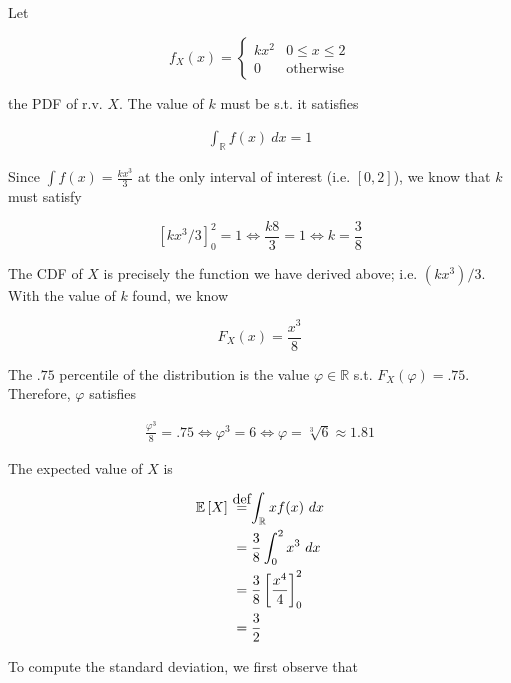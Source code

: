 \documentclass[a4paper, 12pt]{article}
\newcommand\myeq{\stackrel{\mathclap{\normalfont\mbox{def}}}{=}}
\begin{document}
\pagebreak 

Let 

\begin{equation*}
    f_X(x) = \begin{cases}
        kx^2 & 0 \leq x \leq 2 \\ 
        0 & \text{otherwise}
    \end{cases}
\end{equation*}

the PDF of r.v. $X$. The value of $k$ must be s.t. it satisfies 

\begin{align*}
    \int_{\mathbb{R}} f(x) ~ dx = 1
\end{align*}

Since $\int f(x) = \frac{kx^3}{3}$ at the only interval of interest (i.e. $[0, 2]$), we know that $k$
must satisfy 

\begin{equation*}
    \left[ kx^3 / 3 \right]_{0}^{2} = 1 \iff \frac{k8}{3} = 1 \iff k = \frac{3}{8}
\end{equation*}

The CDF of $X$ is precisely the function we have derived above; i.e. $(kx^3) / 3$. With the value 
of $k$ found, we know 

\begin{equation*}
    F_X(x) = \frac{ x^3 }{8}
\end{equation*}

The $.75$ percentile of the distribution is the value $\varphi \in \mathbb{R}$ s.t. 
$F_X(\varphi) = .75$. Therefore, $\varphi$ satisfies

\begin{align*}
    \frac{\varphi^3}{8} = .75 \iff \varphi^3 = 6 \iff \varphi = \sqrt[3]{6} \approx 1.81
\end{align*}


The expected value of $X$ is 

\begin{align*}
    \mathbb{E}\left[ X \right] ~&\myeq \int_{\mathbb{R}} x f(x) ~ dx \\ 
                                &= \frac{3}{8}\int_0^2  x^3 ~ dx \\ 
                                &=\frac{3}{8} \left[ \frac{x^4}{4} \right]_0^2  \\ 
                                &=\frac{3}{2} 
\end{align*}

To compute the standard deviation, we first observe that 
\end{document}
